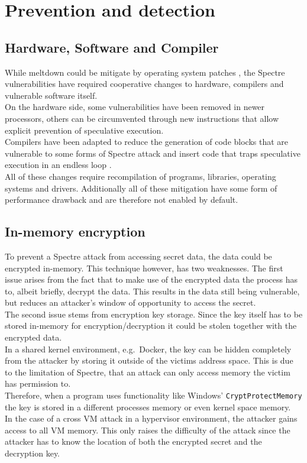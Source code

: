 \documentclass[conference,compsoc,final,a4paper]{IEEEtran}
\begin{document}
\section{Prevention and detection}
\subsection{Hardware, Software and Compiler}
While meltdown could be mitigate by operating system patches \cite{linuxKAISER}, the Spectre vulnerabilities have required cooperative changes to hardware, compilers and vulnerable software itself. \\
On the hardware side, some vulnerabilities have been removed in newer processors, others can be circumvented through new instructions that allow explicit prevention of speculative execution. \cite{intelMitigation} \\
Compilers have been adapted to reduce the generation of code blocks that are vulnerable to some forms of Spectre attack \cite{msvcQSpectre} and insert code that traps speculative execution in an endless loop \cite{retpolineTurner}. \\
All of these changes require recompilation of programs, libraries, operating systems and drivers. Additionally all of these mitigation have some form of performance drawback and are therefore not enabled by default.
\subsection{In-memory encryption}
To prevent a Spectre attack from accessing secret data, the data could be encrypted in-memory. This technique however, has two weaknesses. The first issue arises from the fact that to make use of the encrypted data the process has to, albeit briefly, decrypt the data. This results in the data still being vulnerable, but reduces an attacker's window of opportunity to access the secret. \\
The second issue stems from encryption key storage. Since the key itself has to be stored in-memory for encryption/decryption it could be stolen together with the encrypted data. \\
In a shared kernel environment, e.g.\  Docker, the key can be hidden completely from the attacker by storing it outside of the victims address space. This is due to the limitation of Spectre, that an attack can only access memory the victim has permission to. \cite{kocher2018spectre} \\
Therefore, when a program uses functionality like Windows' \lstinline|CryptProtectMemory| \cite{winCryptMem} the key is stored in a different processes memory or even kernel space memory. \\
In the case of a cross VM attack in a hypervisor environment, the attacker gains access to all VM memory. This only raises the difficulty of the attack since the attacker has to know the location of both the encrypted secret and the decryption key.
\end{document}
